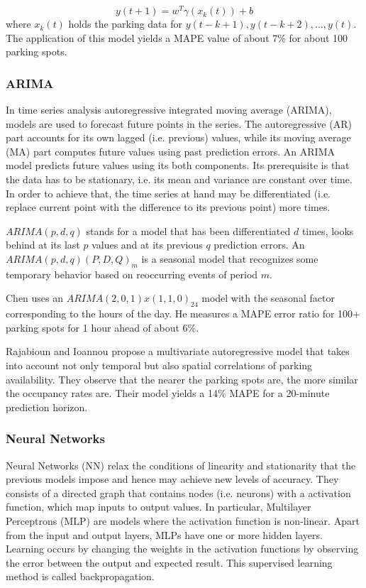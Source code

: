 \documentclass{article}
\begin{document}
$$y(t+1) = w^T\gamma(x_k(t)) + b$$
where $x_k(t)$ holds the parking data for $y(t-k+1), y(t-k+2), ..., y(t)$. The application of this model yields a MAPE value of about 7\% for about 100 parking spots.

\subsubsection{ARIMA}
In time series analysis autoregressive integrated moving average (ARIMA), models are used to forecast future points in the series. The autoregressive (AR) part accounts for its own lagged (i.e. previous) values, while its moving average (MA) part computes future values using past prediction errors. An ARIMA model predicts future values using its both components. Its prerequisite is that the data has to be stationary, i.e. its mean and variance are constant over time. In order to achieve that, the time series at hand may be differentiated (i.e. replace current point with the difference to its previous point) more times.

$ARIMA(p,d,q)$ stands for a model that has been differentiated $d$ times, looks behind at its last $p$ values and at its previous $q$ prediction errors. An $ARIMA(p,d,q)(P,D,Q)_m$ is a seasonal model that recognizes some temporary behavior based on reoccurring events of period $m$.

\vspace{2mm}
Chen\cite{Chen} uses an $ARIMA(2,0,1) x (1,1,0)_{24}$ model with the seasonal factor corresponding to the hours of the day. He measures a MAPE error ratio for 100+ parking spots for 1 hour ahead of about 6\%.

\vspace{2mm}
Rajabioun and Ioannou\cite{Rajabioun} propose a multivariate autoregressive model that takes into account not only temporal but also spatial correlations of parking availability. They observe that the nearer the parking spots are, the more similar the occupancy rates are. Their model yields a 14\% MAPE for a 20-minute prediction horizon.

\subsubsection{Neural Networks}
\label{sec:neural-networks}
Neural Networks (NN) relax the conditions of linearity and stationarity that the previous models impose and hence may achieve new levels of accuracy. They consists of a directed graph that contains nodes (i.e. neurons) with a  activation function, which map inputs to output values. In particular, Multilayer Perceptrons (MLP) are models where the activation function is non-linear. Apart from the input and output layers, MLPs have one or more hidden layers. Learning occurs by changing the weights in the activation functions by observing the error between the output and expected result. This supervised learning method is called backpropagation.
\end{document}
